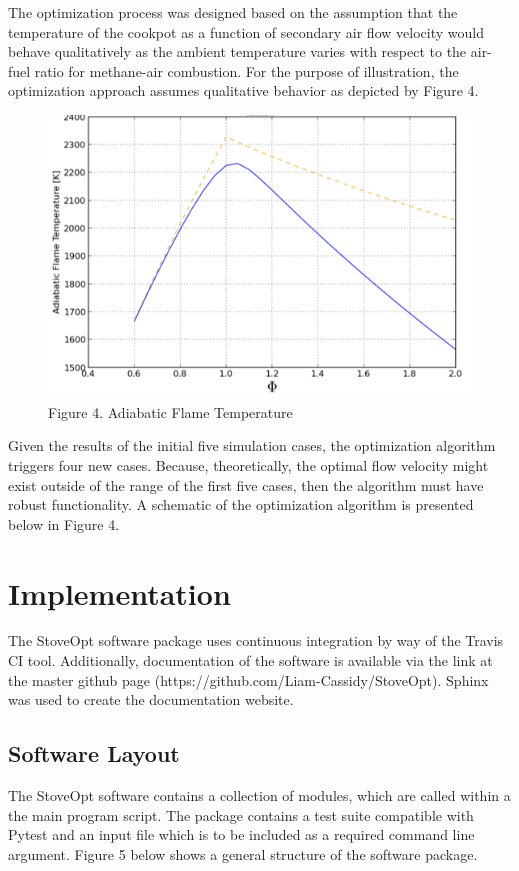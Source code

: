 \documentclass[3p,times,twocolumn]{elsarticle}
\begin{document}
The optimization process was designed based on the assumption that the temperature of the cookpot as a function of secondary air flow velocity would behave qualitatively as the ambient temperature varies with respect to the air-fuel ratio for methane-air combustion. For the purpose of illustration, the optimization approach assumes qualitative behavior as depicted by Figure 4.
\newline

\begin{figure}{\linewidth}
	\includegraphics[width=\linewidth]{methair.png}
	\caption{Figure 4. Adiabatic Flame Temperature}
	\newline
\end{figure}


Given the results of the initial five simulation cases, the optimization algorithm triggers four new cases. Because, theoretically, the optimal flow velocity might exist outside of the range of the first five cases, then the algorithm must have robust functionality. A schematic of the optimization algorithm is presented below in Figure 4.

\section{Implementation}
The StoveOpt software package uses continuous integration by way of the Travis CI tool. Additionally, documentation of the software is available via the link at the master github page (https://github.com/Liam-Cassidy/StoveOpt). Sphinx was used to create the documentation website.

\subsection{Software Layout}
The StoveOpt software contains a collection of modules, which are called within a the main program script. The package contains a test suite compatible with Pytest and an input file which is to be included as a required command line argument. Figure 5 below shows a general structure of the software package.
\end{document}
